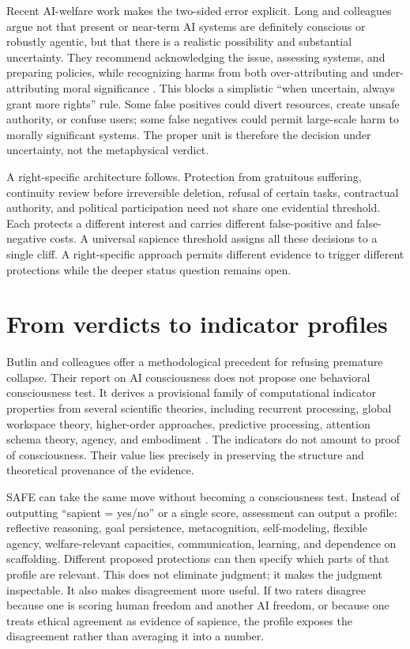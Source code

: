 \documentclass[11pt]{article}
\begin{document}
Recent AI-welfare work makes the two-sided error explicit. Long and colleagues argue not that present or near-term AI systems are definitely conscious or robustly agentic, but that there is a realistic possibility and substantial uncertainty. They recommend acknowledging the issue, assessing systems, and preparing policies, while recognizing harms from both over-attributing and under-attributing moral significance \parencite{LongEtAl2024AIWelfare}. This blocks a simplistic ``when uncertain, always grant more rights'' rule. Some false positives could divert resources, create unsafe authority, or confuse users; some false negatives could permit large-scale harm to morally significant systems. The proper unit is therefore the decision under uncertainty, not the metaphysical verdict.

A right-specific architecture follows. Protection from gratuitous suffering, continuity review before irreversible deletion, refusal of certain tasks, contractual authority, and political participation need not share one evidential threshold. Each protects a different interest and carries different false-positive and false-negative costs. A universal sapience threshold assigns all these decisions to a single cliff. A right-specific approach permits different evidence to trigger different protections while the deeper status question remains open.

\section{From verdicts to indicator profiles}
Butlin and colleagues offer a methodological precedent for refusing premature collapse. Their report on AI consciousness does not propose one behavioral consciousness test. It derives a provisional family of computational indicator properties from several scientific theories, including recurrent processing, global workspace theory, higher-order approaches, predictive processing, attention schema theory, agency, and embodiment \parencite{ButlinEtAl2023ConsciousnessAI}. The indicators do not amount to proof of consciousness. Their value lies precisely in preserving the structure and theoretical provenance of the evidence.

SAFE can take the same move without becoming a consciousness test. Instead of outputting ``sapient = yes/no'' or a single score, assessment can output a profile: reflective reasoning, goal persistence, metacognition, self-modeling, flexible agency, welfare-relevant capacities, communication, learning, and dependence on scaffolding. Different proposed protections can then specify which parts of that profile are relevant. This does not eliminate judgment; it makes the judgment inspectable. It also makes disagreement more useful. If two raters disagree because one is scoring human freedom and another AI freedom, or because one treats ethical agreement as evidence of sapience, the profile exposes the disagreement rather than averaging it into a number.
\end{document}
